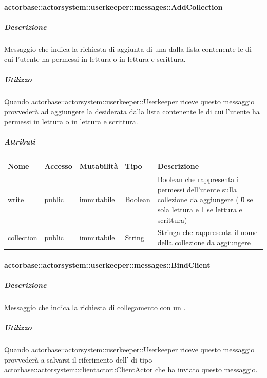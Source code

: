 \documentclass{scalatekids-article}
\begin{document}
\paragraph{actorbase::actorsystem::userkeeper::messages::AddCollection}
\label{sec:actorbase::actorsystem::userkeeper::messages::AddCollection}

\subparagraph{Descrizione}

Messaggio che indica la richiesta di aggiunta di una  dalla
lista contenente le  di cui l'utente ha permessi in lettura
o in lettura e scrittura.

\subparagraph{Utilizzo}

Quando \hyperref[sec:actorbase::actorsystem::userkeeper::Userkeeper]{actorbase::\allowbreak{}actorsystem::\allowbreak{}userkeeper::\allowbreak{}Userkeeper}
riceve questo messaggio provvederà ad aggiungere la  desiderata
dalla lista contenente le  di cui l'utente ha permessi in
lettura o in lettura e scrittura.

\subparagraph{Attributi}
\begin{tabular}{| p{3cm} | p{1.5cm} | p{2cm} | p{2cm} | p{8.5cm} |}
  \hline
  Nome & Accesso & Mutabilità & Tipo & Descrizione \\
  \hline
  write & public & immutabile & Boolean & Boolean che rappresenta i permessi dell'utente sulla collezione da aggiungere ( \=0 se sola lettura e \=1 se lettura e scrittura) \\
  \hline
  collection & public & immutabile & String & Stringa che rappresenta il nome della collezione da aggiungere \\
  \hline
\end{tabular}


\paragraph{actorbase::actorsystem::userkeeper::messages::BindClient}
\label{sec:actorbase::actorsystem::userkeeper::messages::BindClient}

\subparagraph{Descrizione}

Messaggio che indica la richiesta di collegamento con un .

\subparagraph{Utilizzo}

Quando \hyperref[sec:actorbase::actorsystem::userkeeper::Userkeeper]{actorbase::\allowbreak{}actorsystem::\allowbreak{}userkeeper::\allowbreak{}Userkeeper}
riceve questo messaggio provvederà a salvarsi il riferimento dell' di tipo
\hyperref[sec:actorbase::actorsystem::clientactor::ClientActor]{actorbase::\allowbreak{}actorsystem::\allowbreak{}clientactor::\allowbreak{}ClientActor}
che ha inviato questo messaggio.
\end{document}
